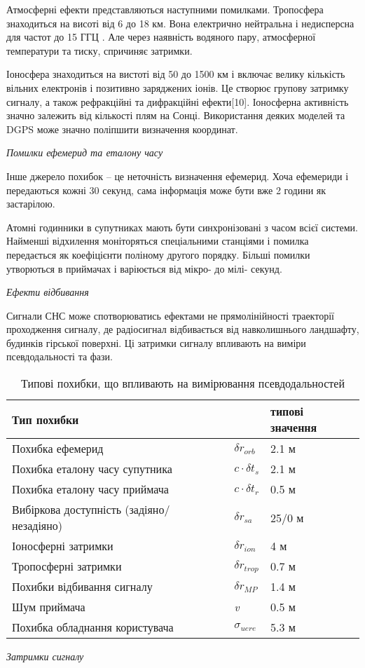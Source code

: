 Атмосферні ефекти представляються наступними помилками. Тропосфера знаходиться 
на висоті від 6 до 18 км. Вона електрично нейтральна і недисперсна для частот 
до 15 ГГЦ \cite{bib:gps1,gps2}. Але через наявність водяного пару, атмосферної температури 
та тиску, спричиняє затримки.

Іоносфера знаходиться на вистоті від 50 до 1500 км і включає велику кількість  
вільних електронів і позитивно заряджених іонів. Це створює групову затримку 
сигналу, а також рефракційні та дифракційні ефекти[10]. Іоносферна 
активність значно залежить від кількості плям на Сонці. Використання деяких 
моделей та DGPS може значно поліпшити визначення координат.

\vspace{5mm}
\textit{Помилки ефемерид та еталону часу}

Інше джерело похибок -- це неточність визначення ефемерид. Хоча 
ефемериди і передаються кожні 30 секунд, сама інформація може бути вже 2 
години як застарілою. 

Атомні годинники в супутниках мають бути синхронізовані з часом 
всієї системи. Найменші відхилення моніторяться спеціальними станціями і 
помилка передається як коефіцієнти поліному другого порядку. Більші помилки 
утворються в приймачах і варіюється від мікро- до мілі- секунд.

\vspace{5mm}
\textit{Ефекти відбивання}

Сигнали СНС може спотворюватись ефектами не прямолінійності траекторії проходження  
сигналу, де радіосигнал відбивається від навколишнього ландшафту, будинків 
гірської поверхні. Ці затримки сигналу впливають на виміри псевдодальності та фази.

\begin{table}[here]
\small
\caption{Типові похибки, що впливають на вимірювання псевдодальностей}
\centering
\begin{tabular}{|p{100mm} p{20mm} p{20mm}|} \hline 
Тип похибки& & типові значення \\ \hline 
Похибка ефемерид & $\delta r_{orb} $ & 2.1 м \\ %
Похибка еталону часу супутника & $c \cdot \delta t_{s}$ & 2.1 м \\ %
Похибка еталону часу приймача  & $c \cdot \delta t_{r}$ & 0.5 м \\ %
Вибіркова доступність (задіяно/ незадіяно) & $\delta r_{sa}$ & 25/0 м \\ %
Іоносферні затримки & $\delta r_{ion} $  & 4 м \\ %
Тропосферні затримки & $\delta r_{trop} $  & 0.7 м \\ %
Похибки відбивання сигналу & $\delta r_{MP} $  & 1.4 м \\ %
Шум приймача & \textit{v} & 0.5 м \\ \hline 
Похибка обладнання користувача & $\sigma_{uere}$ & 5.3 м \\ \hline 
\end{tabular}
\label{tb:sns_main_errors}
\end{table}
\vspace{5mm}
\textit{Затримки сигналу}

